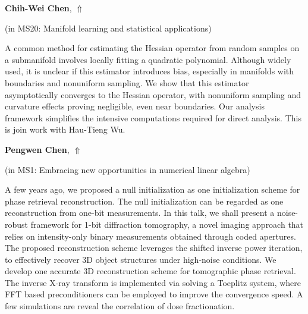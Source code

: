 \documentclass[ILAS2025-program.tex]{subfiles}
\begin{document}
\hypertarget{down0152}{}\begin{ilasabstract}
    
\textbf{Chih-Wei Chen},  \hfill \hyperlink{up0152}{$\Uparrow$}
    
    
(in {\color{mstitle}MS20: Manifold learning and statistical applications})
        
\mtskip
    A common method for estimating the Hessian operator from random samples on a submanifold involves locally fitting a quadratic polynomial. Although widely used, it is unclear if this estimator introduces bias, especially in manifolds with boundaries and nonuniform sampling. We show that this estimator asymptotically converges to the Hessian operator, with nonuniform sampling and curvature effects proving negligible, even near boundaries. Our analysis framework simplifies the intensive computations required for direct analysis. This is join work with Hau-Tieng Wu. 

\end{ilasabstract}
    

\hypertarget{down0305}{}\begin{ilasabstract}
    
\textbf{Pengwen Chen},  \hfill \hyperlink{up0305}{$\Uparrow$}
    
    
(in {\color{mstitle}MS1: Embracing new opportunities in numerical linear algebra})
        
\mtskip
    A few years ago, we proposed a null initialization as one initialization scheme for phase retrieval
reconstruction. The null initialization can be regarded as one reconstruction from  one-bit measurements. In this talk, we shall
present a noise-robust framework for 1-bit diffraction tomography, a novel imaging approach that
relies on intensity-only binary measurements obtained through coded apertures. The proposed
reconstruction scheme leverages the shifted inverse power iteration, to
effectively recover 3D object structures under high-noise conditions. We develop one accurate 3D
reconstruction scheme for tomographic phase retrieval. The inverse X-ray transform is implemented via 
solving a Toeplitz system, where FFT based preconditioners can be employed to improve the
convergence speed. A few simulations are reveal the correlation of dose fractionation.

\end{ilasabstract}
    
\end{document}
